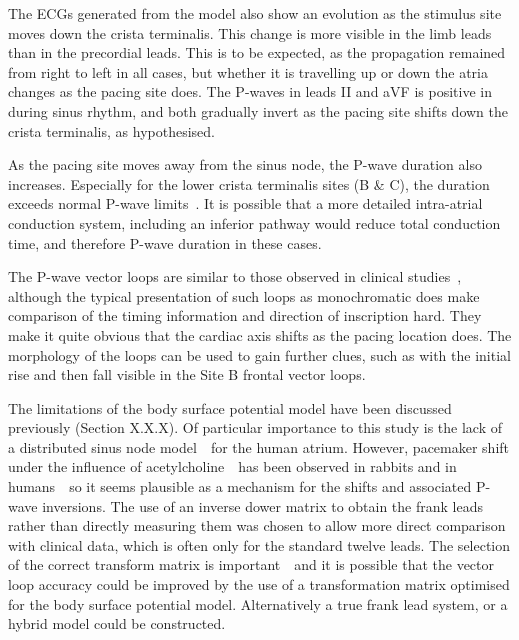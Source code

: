 The ECGs generated from the model also show an evolution as the stimulus site
moves down the crista terminalis.
This change is more visible in the limb leads than in the precordial leads.
This is to be expected, as the propagation remained from right to left in all
cases, but whether it is travelling up or down the atria changes as the pacing
site does.
The P-waves in leads II and aVF is positive in during sinus rhythm, and both
gradually invert as the pacing site shifts down the crista terminalis, as
hypothesised.

As the pacing site moves away from the sinus node, the P-wave duration also
increases.
Especially for the lower crista terminalis sites (B \& C), the duration exceeds
normal P-wave limits~\cite{Lemery2004,Macfarlane1989}.
It is possible that a more detailed intra-atrial conduction system, including an
inferior pathway would reduce total conduction time, and therefore P-wave
duration in these cases.

The P-wave vector loops are similar to those observed in clinical
studies~\cite{Carlson2005,Holmqvist2007,Havmoller2007,Guillem2007}, although the typical
presentation of such loops as monochromatic does make comparison of the timing
information and direction of inscription hard.
They make it quite obvious that the cardiac axis shifts as the pacing location
does.
The morphology of the loops can be used to gain further clues, such as with the
initial rise and then fall visible in the Site B frontal vector loops.

The limitations of the body surface potential model have been discussed
previously (Section X.X.X).
Of particular importance to this study is the lack of a distributed sinus node
model~\cite{Yamamoto2007,Dobrzynski2005}\ for the human atrium.
However, pacemaker shift under the influence of
acetylcholine~\cite{Shibata2001}\ has been observed in rabbits and in
humans~\cite{Opthof1988}\ so it seems plausible as a mechanism for the shifts
and associated P-wave inversions.
The use of an inverse dower matrix to obtain the frank leads rather than
directly measuring them was chosen to allow more direct comparison with clinical
data, which is often only for the standard twelve leads.
The selection of the correct transform matrix is
important~\cite{Guillem2007,Luo1991,Hyttinen1995}\ and it is possible that the
vector loop accuracy could be improved by the use of a transformation matrix
optimised for the body surface potential model.
Alternatively a true frank lead system, or a hybrid model could be constructed.

